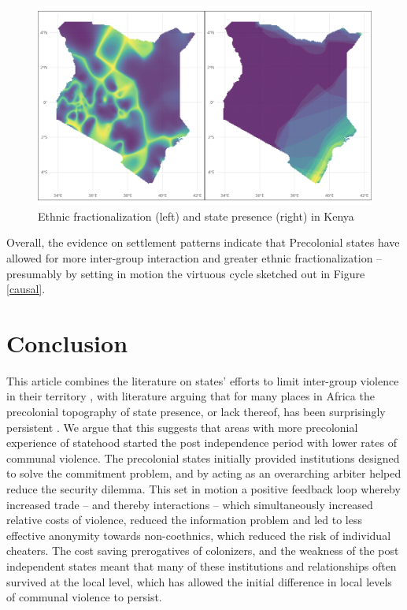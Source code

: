 \begin{figure}[htpb]
	\centering
	\includegraphics[width=1\linewidth]{img/kenplots.png}
	\caption{Ethnic fractionalization (left) and state presence (right) in
	Kenya}%
	\label{kenplots}
\end{figure}

Overall, the evidence on settlement patterns indicate that Precolonial states
have allowed for more inter-group interaction and greater ethnic
fractionalization -- presumably by setting in motion the virtuous cycle sketched
out in Figure \ref{causal}.

\section{Conclusion} \label{Conclusion}

This article combines the literature on states' efforts to limit inter-group
violence in their territory \citep{Olson1993, Pinker2012, tilly_1985}, with
literature arguing that for many places in Africa the precolonial topography of
state presence, or lack thereof, has been surprisingly
persistent \citep{boone2014property, englebert2013inside}. We argue that this
suggests that areas with more precolonial experience of statehood started the
post independence period with lower rates of communal violence. The precolonial
states initially provided institutions designed to solve the commitment problem,
and by acting as an overarching arbiter helped reduce the security dilemma. This
set in motion a positive feedback loop whereby increased trade -- and thereby
interactions -- which simultaneously increased relative costs of violence,
reduced the information problem and led to less effective anonymity towards
non-coethnics, which reduced the risk of individual cheaters. The cost saving
prerogatives of colonizers, and the weakness of the post independent states
meant that many of these institutions and relationships often survived at the
local level, which has allowed the initial difference in local levels of
communal violence to persist. 

